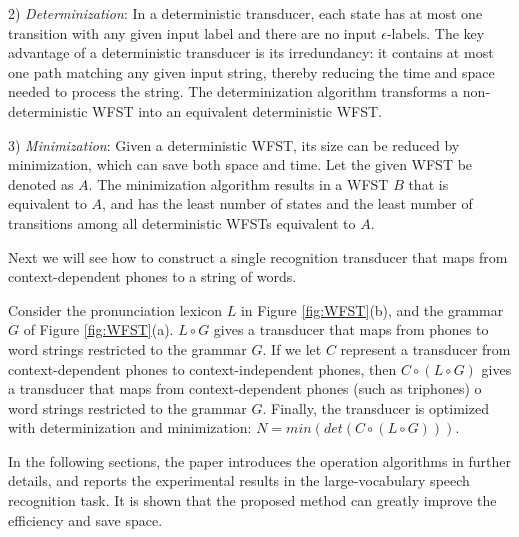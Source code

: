 2) \emph{Determinization}: In a deterministic transducer, each state has at most one transition with any given input label and there are no input $\epsilon$-labels. The key advantage of a deterministic transducer is its irredundancy: it contains at most one path matching any given input string, thereby reducing the time and space needed to process the string. The determinization algorithm transforms a non-deterministic WFST into an equivalent deterministic WFST.

3) \emph{Minimization}: Given a deterministic WFST, its size can be reduced by minimization, which can save both space and time. Let the given WFST be denoted as $A$. The minimization algorithm results in a WFST $B$ that is equivalent to $A$, and has the least number of states and the least number of transitions among all deterministic WFSTs equivalent to $A$.

Next we will see how to construct a single recognition transducer that maps from context-dependent phones to a string of words.

Consider the pronunciation lexicon $L$ in Figure \ref{fig:WFST}(b), and the grammar $G$ of Figure \ref{fig:WFST}(a). $L \circ G$ gives a transducer that maps from phones to word strings restricted to the grammar $G$. If we let $C$ represent a transducer from context-dependent phones to context-independent phones, then $C \circ (L \circ G)$ gives a transducer that maps from context-dependent phones (such as triphones) o word strings restricted to the grammar $G$. Finally, the transducer is optimized with determinization and minimization: $N = min(det(C \circ (L \circ G)))$.

In the following sections, the paper introduces the operation algorithms in further details, and reports the experimental results in the large-vocabulary speech recognition task. It is shown that the proposed method can greatly improve the efficiency and save space. 